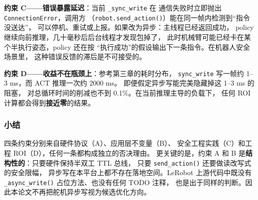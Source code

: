 \textbf{约束 C——错误暴露延迟}：当前 \texttt{\_sync\_write} 在
通信失败时立即抛出 \texttt{ConnectionError}，调用方
（\texttt{robot.send\_action()}）能在同一帧内检测到``指令没送达''，
可以停机、重试或上报。如果改为异步：主线程已经返回成功，
policy 继续向前推理，几十毫秒后后台线程才发现包掉了，
此时机械臂可能已经卡在某个半执行姿态，policy 还在按
``执行成功''的假设输出下一条指令。在机器人安全场景里，
这种错误反馈的滞后是不可接受的。

\textbf{约束 D——收益不在瓶颈上}：参考第三章的耗时分布，
\texttt{sync\_write} 写一帧约 1--3 ms，而 ACT 推理一次约 2000 ms。
即便假定异步写能完美隐藏掉这 1--3 ms 的阻塞，
对总循环时间的削减也不到 0.1\%。在当前推理主导的负载下，
任何 ROI 计算都会得到\textbf{接近零}的结果。

\subsubsection{小结}\label{sec:async-write-conclusion}

四条约束分别来自硬件协议（A）、应用层不变量（B）、
安全工程实践（C）和工程 ROI（D），任何一条都构成独立的否决理由。
更关键的是，约束 A 和 B 是\textbf{结构性的}：只要硬件保持半双工 TTL 总线，
只要 \texttt{send\_action()} 还要做读改写式的安全限幅，
异步写在本平台上都不存在落地空间。LeRobot 上游代码中既没有
\texttt{\_async\_write()} 占位方法、也没有任何 TODO 注释，
也是出于同样的判断。因此本论文不再把舵机异步写视为候选优化方向。
